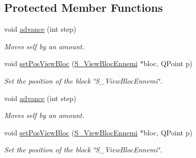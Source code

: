 \subsection*{Protected Member Functions}
\begin{DoxyCompactItemize}
\item 
void \hyperlink{class_ennemi_a68785ba49227d8588b0acc1fcc9856fa}{advance} (int step)
\begin{DoxyCompactList}\small\item\em Moves self by an amount. \end{DoxyCompactList}\item 
void \hyperlink{class_ennemi_a029f6711fe3817f9697a8369718e50f6}{set\+Pos\+View\+Bloc} (\hyperlink{class_s___view_bloc_ennemi}{S\+\_\+\+View\+Bloc\+Ennemi} $\ast$bloc, Q\+Point p)
\begin{DoxyCompactList}\small\item\em Set the position of the block \char`\"{}\+S\+\_\+\+View\+Bloc\+Ennemi\char`\"{}. \end{DoxyCompactList}\item 
void \hyperlink{class_ennemi_a68785ba49227d8588b0acc1fcc9856fa}{advance} (int step)
\begin{DoxyCompactList}\small\item\em Moves self by an amount. \end{DoxyCompactList}\item 
void \hyperlink{class_ennemi_a029f6711fe3817f9697a8369718e50f6}{set\+Pos\+View\+Bloc} (\hyperlink{class_s___view_bloc_ennemi}{S\+\_\+\+View\+Bloc\+Ennemi} $\ast$bloc, Q\+Point p)
\begin{DoxyCompactList}\small\item\em Set the position of the block \char`\"{}\+S\+\_\+\+View\+Bloc\+Ennemi\char`\"{}. \end{DoxyCompactList}\end{DoxyCompactItemize}
